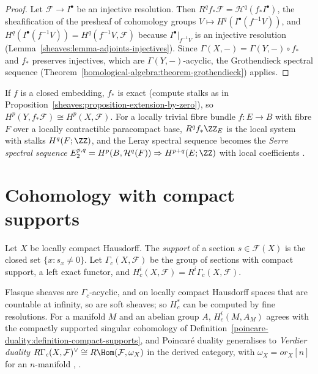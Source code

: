 \begin{proof}
Let $\mathcal{F} \to I^\bullet$ be an injective resolution. Then $R^qf_*\mathcal{F} = \mathcal{H}^q(f_*I^\bullet)$, the sheafification of the presheaf of cohomology groups
$V \mapsto H^q(I^\bullet(f^{-1}V))$, and $H^q(I^\bullet(f^{-1}V)) = H^q(f^{-1}V, \mathcal{F})$ because $I^\bullet|_{f^{-1}V}$ is an injective resolution
(Lemma~\ref{sheaves:lemma-adjoints-injectives}). Since $\Gamma(X, -) = \Gamma(Y, -) \circ f_*$ and $f_*$ preserves injectives, which are $\Gamma(Y, -)$-acyclic, the Grothendieck
spectral sequence (Theorem~\ref{homological-algebra:theorem-grothendieck}) applies.
\end{proof}

\begin{example}\label{sheaves:example-leray}
If $f$ is a closed embedding, $f_*$ is exact (compute stalks as in Proposition~\ref{sheaves:proposition-extension-by-zero}), so $H^p(Y, f_*\mathcal{F}) \cong H^p(X, \mathcal{F})$. For a locally
trivial fibre bundle $f \colon E \to B$ with fibre $F$ over a locally contractible paracompact base, $R^qf_*\ZZ_E$ is the local system with stalks $H^q(F; \ZZ)$, and the Leray spectral sequence
becomes the \emph{Serre spectral sequence} $E_2^{p,q} = H^p(B, \mathcal{H}^q(F)) \Rightarrow H^{p+q}(E; \ZZ)$ with local coefficients \cite{bredon-sheaf}.
\end{example}

\section{Cohomology with compact supports}\label{sheaves:section-compact-supports}

\begin{definition}\label{sheaves:definition-compact-supports}
Let $X$ be locally compact Hausdorff. The \emph{support} of a section $s \in \mathcal{F}(X)$ is the closed set $\{x : s_x \neq 0\}$. Let $\Gamma_c(X, \mathcal{F})$ be the group of sections with
compact support, a left exact functor, and $H^i_c(X, \mathcal{F}) = R^i\Gamma_c(X, \mathcal{F})$.
\end{definition}

\begin{remark}\label{sheaves:remark-compact-supports}
Flasque sheaves are $\Gamma_c$-acyclic, and on locally compact Hausdorff spaces that are countable at infinity, so are soft sheaves; so $H^*_c$ can be computed by fine resolutions. For
a manifold $M$ and an abelian group $A$, $H^i_c(M, A_M)$ agrees with the compactly supported singular cohomology of Definition~\ref{poincare-duality:definition-compact-supports}, and
Poincar\'e duality generalises to \emph{Verdier duality} $R\Gamma_c(X, \mathcal{F})^\vee \cong R\Hom(\mathcal{F}, \omega_X)$ in the derived category, with $\omega_X = \mathit{or}_X[n]$ for an
$n$-manifold \cite[Chapter III]{ks-sheaves-manifolds}, \cite{iversen-sheaves}.
\end{remark}

